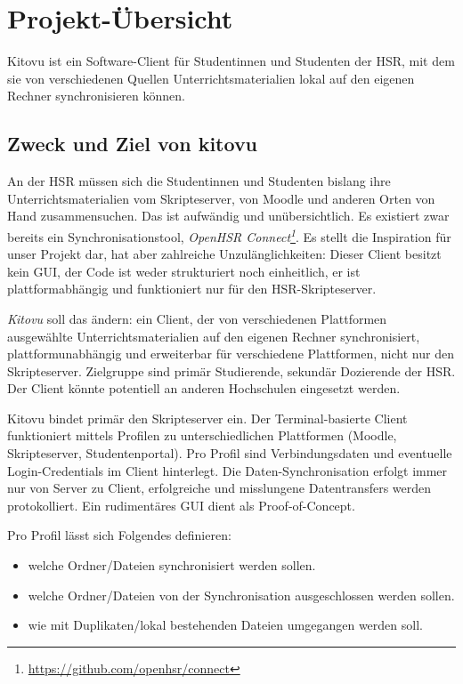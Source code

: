 \documentclass[a4paper]{article}
\let\oldsection\section
\renewcommand\section{\clearpage\oldsection}
\newcommand{\tool}[2]{\emph{#1\footnote{\url{#2}}}}
\begin{document}
\section{Projekt-Übersicht}
Kitovu ist ein Software-Client für Studentinnen und Studenten der HSR, mit dem sie von verschiedenen Quellen Unterrichtsmaterialien lokal auf den eigenen Rechner synchronisieren können.

\subsection{Zweck und Ziel von kitovu}
An der HSR müssen sich die Studentinnen und Studenten bislang ihre Unterrichtsmaterialien vom Skripteserver, von Moodle und anderen Orten von Hand zusammensuchen. Das ist aufwändig und unübersichtlich. Es existiert zwar bereits ein Synchronisationstool, \tool{OpenHSR Connect}{https://github.com/openhsr/connect}. Es stellt die Inspiration für unser Projekt dar, hat aber zahlreiche Unzulänglichkeiten: Dieser Client besitzt kein GUI, der Code ist weder strukturiert noch einheitlich, er ist plattformabhängig und funktioniert nur für den HSR-Skripteserver.

\emph{Kitovu} soll das ändern: ein Client, der von verschiedenen Plattformen ausgewählte Unterrichtsmaterialien auf den eigenen Rechner synchronisiert, plattformunabhängig und erweiterbar für verschiedene Plattformen, nicht nur den Skripteserver. Zielgruppe sind primär Studierende, sekundär Dozierende der HSR. Der Client könnte potentiell an anderen Hochschulen eingesetzt werden.

Kitovu bindet primär den Skripteserver ein. Der Terminal-basierte Client funktioniert mittels Profilen zu unterschiedlichen Plattformen (Moodle, Skripteserver, Studentenportal). Pro Profil sind Verbindungsdaten und eventuelle Login-Credentials im Client hinterlegt. Die Daten-Synchronisation erfolgt immer nur von Server zu Client, erfolgreiche und misslungene Datentransfers werden protokolliert. Ein rudimentäres GUI dient als Proof-of-Concept.

Pro Profil lässt sich Folgendes definieren:

\begin{itemize}
  \item welche Ordner/Dateien synchronisiert werden sollen.
  \item welche Ordner/Dateien von der Synchronisation ausgeschlossen werden sollen.
  \item wie mit Duplikaten/lokal bestehenden Dateien umgegangen werden soll.
\end{itemize}
\end{document}
